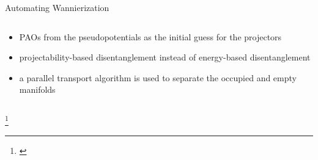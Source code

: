 \documentclass[xcolor=table,aspectratio=169]{beamer}
\newcommand\blfootcite[1]{%
  \begingroup
  \renewcommand\thefootnote{}\footnote{\hspace{-4ex}\cite{#1}}%
  \addtocounter{footnote}{-1}%
  \endgroup
}
\numberwithin{equation}{section}
\begin{document}
\begin{frame}{Automating Wannierization}
\begin{columns}
\begin{column}{0.5\textwidth}
         \begin{itemize}[<+(1)->]
            \item PAOs from the pseudopotentials as the initial guess for the projectors
            \item projectability-based disentanglement instead of energy-based disentanglement
            \item a parallel transport algorithm is used to separate the occupied and empty manifolds
         \end{itemize}
      \end{column}
   \end{columns}

   \blfootcite{Qiao2023,Qiao2023a}

\end{frame}
\end{document}
